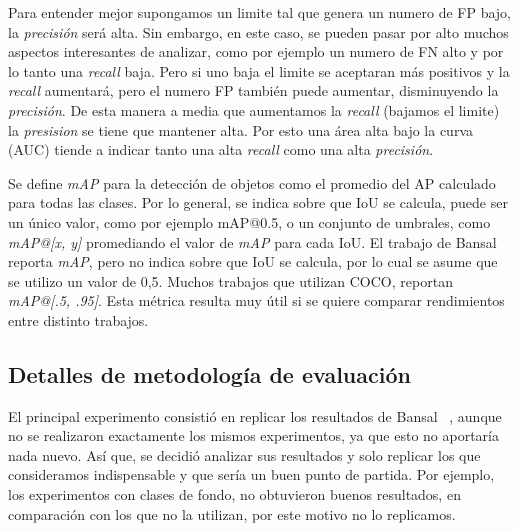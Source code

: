 Para entender mejor supongamos un limite tal que genera un numero de FP bajo, la \textit{precisión} será alta. Sin embargo, en este caso, se pueden pasar por alto muchos aspectos interesantes de analizar, como por ejemplo un numero de FN alto y por lo tanto una \textit{recall} baja. Pero si uno baja el limite se aceptaran más positivos y la \textit{recall} aumentará, pero el numero FP también puede aumentar, disminuyendo la \textit{precisión}. De esta manera a media que aumentamos la \textit{recall} (bajamos el limite) la \textit{presision} se tiene que mantener alta. Por esto una área alta bajo la curva (AUC) tiende a indicar tanto una alta \textit{recall} como una alta \textit{precisión}.


Se define \textit{mAP} para la detección de objetos como el promedio del AP calculado para todas las clases. Por lo general, se indica sobre que IoU se calcula, puede ser un único valor, como por ejemplo mAP@0.5, o un conjunto de umbrales, como \textit{mAP@[x, y]} promediando el valor de \textit{mAP} para cada IoU. El trabajo de Bansal \etal~\cite{bansal2018zero} reporta \textit{mAP}, pero no indica sobre que IoU se calcula, por lo cual se asume que se utilizo un valor de 0,5. Muchos trabajos que utilizan COCO, reportan \textit{mAP@[.5, .95]}. Esta métrica resulta muy útil si se quiere comparar rendimientos entre distinto trabajos.


\subsection{Detalles de metodología de evaluación} \label{ssec:detallesdemetodologiadeevaluacion}
El principal experimento consistió en replicar los resultados de Bansal \etal~\cite{bansal2018zero}, aunque no se realizaron exactamente los mismos experimentos, ya que esto no aportaría nada nuevo. Así que, se decidió analizar sus resultados y solo replicar los que consideramos indispensable y que sería un buen punto de partida. Por ejemplo, los experimentos con clases de fondo, no obtuvieron buenos resultados, en comparación con los que no la utilizan, por este motivo no lo replicamos.\\


